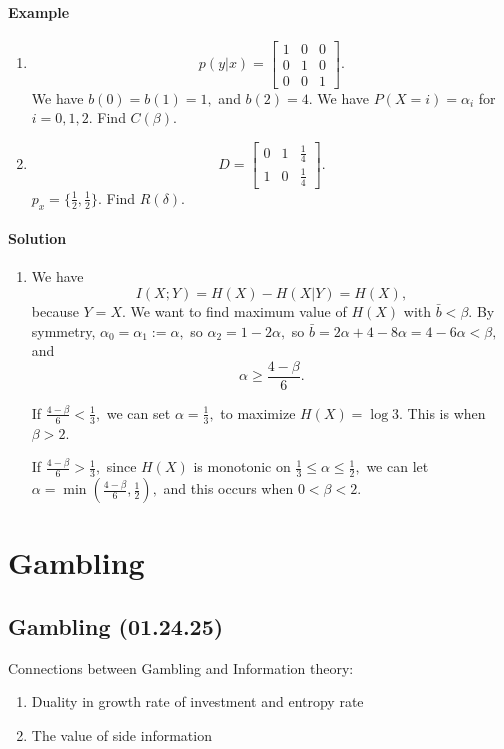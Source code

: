 \documentclass[12pt]{article}
\theoremstyle{remark}
\begin{document}
\paragraph{Example}
\begin{enumerate}
    \item \[p(y|x)=\begin{bmatrix}
        1&0&0\\
        0&1&0\\
        0&0&1
    \end{bmatrix}.\] We have $b(0)=b(1)=1,$ and $b(2)=4.$ We have $P(X=i)=\alpha_i$ for $i=0,1,2.$ Find $C(\beta).$
    \item \[D=\begin{bmatrix}
        0&1&\frac{1}{4}\\
        1&0&\frac{1}{4}
    \end{bmatrix}.\]
    $p_x=\{\frac{1}{2},\frac{1}{2}\}.$ Find $R(\delta).$
\end{enumerate}

\paragraph{Solution}
\begin{enumerate}
    \item We have 
    \[I(X;Y)=H(X)-H(X|Y)=H(X),\] because $Y=X.$ We want to find maximum value of $H(X)$ with $\bar{b}<\beta.$ By symmetry, $\alpha_0=\alpha_1:=\alpha,$ so $\alpha_2=1-2\alpha,$ so $\bar{b}=2\alpha+4-8\alpha=4-6\alpha<\beta,$ and \[\alpha\ge\frac{4-\beta}{6}.\]

    If $\frac{4-\beta}{6}<\frac{1}{3},$ we can set $\alpha=\frac{1}{3},$ to maximize $H(X)=\log 3.$ This is when $\beta>2.$

    If $\frac{4-\beta}{6}>\frac{1}{3},$ since $H(X)$ is monotonic on $\frac{1}{3}\le \alpha\le\frac{1}{2},$ we can let $\alpha=\min(\frac{4-\beta}{6},\frac{1}{2}),$ and this occurs when $0<\beta<2.$
    
\end{enumerate}

\section{Gambling}
\subsection{Gambling (01.24.25)}
Connections between Gambling and Information theory:
\begin{enumerate}
    \item Duality in growth rate of investment and entropy rate
    \item The value of side information
\end{enumerate}
\end{document}
